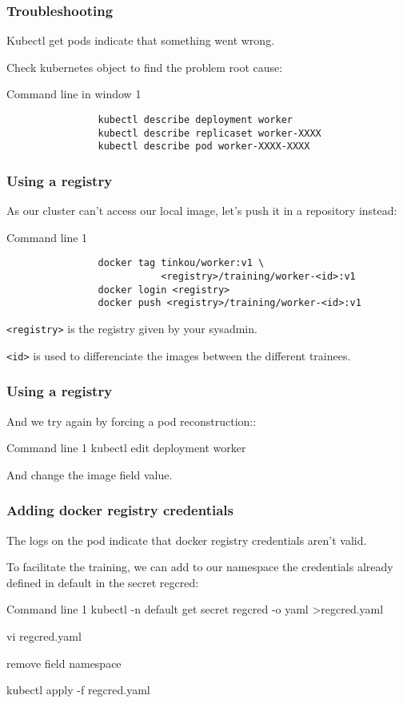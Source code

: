 	\begin{frame}[fragile]
		\frametitle{Troubleshooting}
		
		Kubectl get pods indicate that something went wrong.
		
		Check kubernetes object to find the problem root cause:
		\begin{block}{Command line in window 1}
			\begin{verbatim}
				kubectl	describe deployment worker
				kubectl describe replicaset worker-XXXX
				kubectl describe pod worker-XXXX-XXXX
			\end{verbatim}
		\end{block}
		
	\end{frame}
	
	\begin{frame}[fragile]
		\frametitle{Using a registry}
		
		As our cluster can't access our local image, let's push it in a repository instead:
		\begin{block}{Command line 1}
			\begin{verbatim}
				docker tag tinkou/worker:v1 \
				           <registry>/training/worker-<id>:v1
				docker login <registry>
				docker push <registry>/training/worker-<id>:v1
			\end{verbatim}
		\end{block}
		\verb|<registry>| is the registry given by your sysadmin.
		
		\verb|<id>| is used to differenciate the images between the different trainees.

	\end{frame}
	
	\begin{frame}
		\frametitle{Using a registry}
	
		And we try again by forcing a pod reconstruction::
		\begin{block}{Command line 1}
			kubectl edit deployment worker
			
			\bigskip
			And change the image field value.
		\end{block}
	
	\end{frame}

	\begin{frame}
		\frametitle{Adding docker registry credentials}
		
		The logs on the pod indicate that docker registry credentials aren't valid.
		
		To facilitate the training, we can add to our namespace the credentials already defined in default in the secret regcred:
		\begin{block}{Command line 1}
				kubectl -n default get secret regcred -o yaml >regcred.yaml
				
				\medskip
				vi regcred.yaml
				
				remove field namespace
				
				\medskip
				kubectl apply -f regcred.yaml
		\end{block}
	\end{frame}
	
